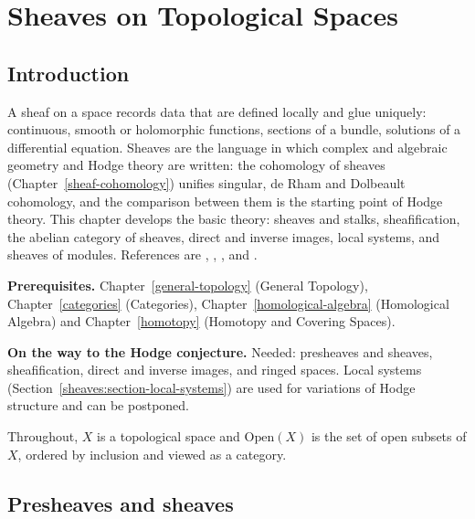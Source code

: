 \chapter{Sheaves on Topological Spaces}\label{sheaves}

\section{Introduction}\label{sheaves:section-introduction}

A sheaf on a space records data that are defined locally and glue uniquely: continuous, smooth or holomorphic functions,
sections of a bundle, solutions of a differential equation. Sheaves are the language in which complex and algebraic geometry and
Hodge theory are written: the cohomology of sheaves (Chapter~\ref{sheaf-cohomology}) unifies singular, de Rham and Dolbeault
cohomology, and the comparison between them is the starting point of Hodge theory. This chapter develops the basic theory: sheaves
and stalks, sheafification, the abelian category of sheaves, direct and inverse images, local systems, and sheaves of modules.
References are \cite{godement-faisceaux}, \cite{bredon-sheaf}, \cite{ks-sheaves-manifolds}, \cite[Chapter II]{hartshorne-ag} and
\cite{stacks-project}.

\noindent\textbf{Prerequisites.} Chapter~\ref{general-topology} (General Topology), Chapter~\ref{categories} (Categories),
Chapter~\ref{homological-algebra} (Homological Algebra) and Chapter~\ref{homotopy} (Homotopy and Covering Spaces).

\noindent\textbf{On the way to the Hodge conjecture.} Needed: presheaves and sheaves, sheafification, direct and inverse images, and ringed spaces. Local systems (Section~\ref{sheaves:section-local-systems}) are used for
variations of Hodge structure and can be postponed.

Throughout, $X$ is a topological space and $\mathrm{Open}(X)$ is the set of open subsets of $X$, ordered by inclusion and viewed as a category.

\section{Presheaves and sheaves}\label{sheaves:section-sheaves}

